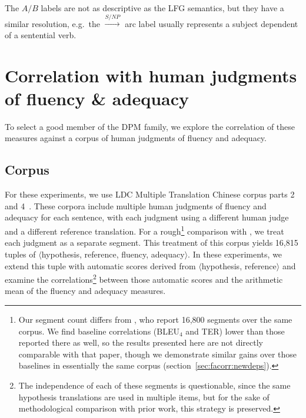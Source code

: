 \documentclass[11pt]{article}
\newcommand{\DPM}[1]{\ensuremath{\mathrm{DPM}_{#1}}}
\newcommand{\DPMempty}{\ensuremath{\DPM{}}}
\begin{document}
The $A/B$ labels are not as descriptive as the LFG semantics, but they
have a similar resolution, e.g.\ the $\stackrel{S/NP}{\to}$ arc label
usually represents a subject dependent of a sentential verb.

\section{Correlation with human judgments of fluency \& adequacy}
\label{sec:facorr}

To select a good member of the \DPMempty{} family, we explore the
correlation of these measures against a corpus of human judgments of
fluency and adequacy. 

\subsection{Corpus}

For these experiments, we use LDC Multiple Translation Chinese corpus
parts 2~\cite{LDC03MTC2} and 4~\cite{LDC06MTC4}.  These corpora
include multiple human judgments of fluency and adequacy for each
sentence, with each judgment using a different human judge and a
different reference translation.  For a rough\footnote{Our segment
  count differs from , who report
  16,800 segments over the same corpus. We find baseline correlations
  (BLEU$_4$ and TER) lower than those reported there as well, so the
  results presented here are not directly comparable with that paper,
  though we demonstrate similar gains over those baselines in
  essentially the same corpus (section~\ref{sec:facorr:newdeps}).}
comparison with , we treat each
judgment as a separate segment.
%
This treatment of this corpus yields 16,815 tuples of
$\langle$hypothesis, reference, fluency, adequacy$\rangle$.  In these
experiments, we extend this tuple with automatic scores derived from
$\langle$hypothesis, reference$\rangle$ and examine the
correlations\footnote{The independence of each of these segments is
  questionable, since the same hypothesis translations are used in
  multiple items, but for the sake of methodological comparison with
  prior work, this strategy is preserved.}  between those automatic
scores and the arithmetic mean of the fluency and adequacy measures.
\end{document}

